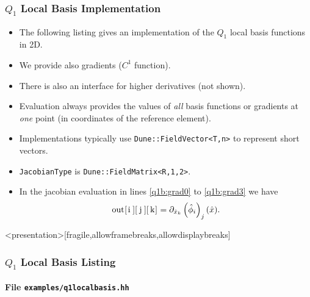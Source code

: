 \begin{frame}
\end{frame}

\begin{frame}[fragile]
\frametitle{$Q_1$ Local Basis Implementation}
\begin{itemize}
\item The following listing gives an implementation of the $Q_1$ local basis
functions in 2D. 
\item We provide also gradients ($C^1$ function).
\item There is also an interface for higher derivatives (not shown).
\item Evaluation always provides the values of \textit{all} basis functions
or gradients at \textit{one} point (in coordinates of the reference element). 
\item Implementations typically use \lstinline{Dune::FieldVector<T,n>} to
represent short vectors.
\item \lstinline{JacobianType} is \lstinline{Dune::FieldMatrix<R,1,2>}.
\item In the jacobian evaluation in lines \ref{q1b:grad0} to \ref{q1b:grad3}
we have
\begin{equation*}
\text{\lstinline{out[i][j][k]}}
= \partial_{\hat{x}_k} \left(\hat\phi_i\right)_j (\hat{x}) . 
\end{equation*}
\end{itemize}
\end{frame}


\begin{frame}<presentation>[fragile,allowframebreaks,allowdisplaybreaks]
\frametitle<presentation>{$Q_1$ Local Basis Listing}
\framesubtitle<presentation>{File \texttt{examples/q1localbasis.hh}}

\end{frame}


